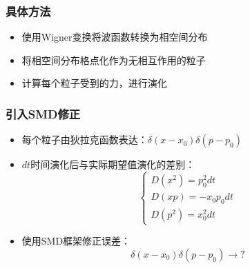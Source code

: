 \documentclass{beamer}
\begin{document}
\begin{frame}[t]\frametitle{具体方法}
\begin{itemize}
	\item 使用Wigner变换将波函数转换为相空间分布
	\item 将相空间分布格点化作为无相互作用的粒子
	\item 计算每个粒子受到的力，进行演化
\end{itemize}

\begin{figure}
\end{figure}


\end{frame}

\begin{frame}[t]\frametitle{引入SMD修正}
\begin{itemize}
	\item 每个粒子由狄拉克函数表达：$\delta(x-x_0)\delta(p-p_0)$
	\item $dt$时间演化后与实际期望值演化的差别：
\begin{equation}
\begin{cases}
	D(x^2) = p_0^2 dt \\
	D(x p) = - x_0 p_0 dt \\
	D(p^2) = x_0^2 dt
\end{cases}
\end{equation}
	\item 使用SMD框架修正误差：
	\begin{equation*}
		\delta(x-x_0)\delta(p-p_0) \rightarrow \mathbf{?}
	\end{equation*}
\end{itemize}
\end{frame}
\end{document}
